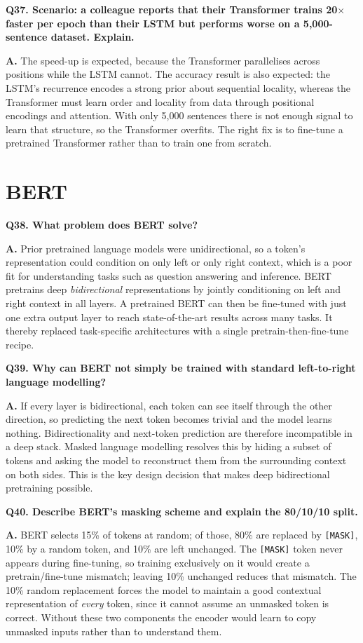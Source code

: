\documentclass[11pt]{article}
\begin{document}
\medskip
\noindent\textbf{Q37. Scenario: a colleague reports that their Transformer trains 20$\times$ faster per epoch than their LSTM but performs worse on a 5{,}000-sentence dataset. Explain.}

\noindent\textbf{A.} The speed-up is expected, because the Transformer parallelises across positions while the LSTM cannot. The accuracy result is also expected: the LSTM's recurrence encodes a strong prior about sequential locality, whereas the Transformer must learn order and locality from data through positional encodings and attention. With only 5{,}000 sentences there is not enough signal to learn that structure, so the Transformer overfits. The right fix is to fine-tune a pretrained Transformer rather than to train one from scratch.

\section{BERT}

\noindent\textbf{Q38. What problem does BERT solve?}

\noindent\textbf{A.} Prior pretrained language models were unidirectional, so a token's representation could condition on only left or only right context, which is a poor fit for understanding tasks such as question answering and inference. BERT pretrains deep \emph{bidirectional} representations by jointly conditioning on left and right context in all layers. A pretrained BERT can then be fine-tuned with just one extra output layer to reach state-of-the-art results across many tasks. It thereby replaced task-specific architectures with a single pretrain-then-fine-tune recipe.

\medskip
\noindent\textbf{Q39. Why can BERT not simply be trained with standard left-to-right language modelling?}

\noindent\textbf{A.} If every layer is bidirectional, each token can see itself through the other direction, so predicting the next token becomes trivial and the model learns nothing. Bidirectionality and next-token prediction are therefore incompatible in a deep stack. Masked language modelling resolves this by hiding a subset of tokens and asking the model to reconstruct them from the surrounding context on both sides. This is the key design decision that makes deep bidirectional pretraining possible.

\medskip
\noindent\textbf{Q40. Describe BERT's masking scheme and explain the 80/10/10 split.}

\noindent\textbf{A.} BERT selects 15\% of tokens at random; of those, 80\% are replaced by \texttt{[MASK]}, 10\% by a random token, and 10\% are left unchanged. The \texttt{[MASK]} token never appears during fine-tuning, so training exclusively on it would create a pretrain/fine-tune mismatch; leaving 10\% unchanged reduces that mismatch. The 10\% random replacement forces the model to maintain a good contextual representation of \emph{every} token, since it cannot assume an unmasked token is correct. Without these two components the encoder would learn to copy unmasked inputs rather than to understand them.
\end{document}
